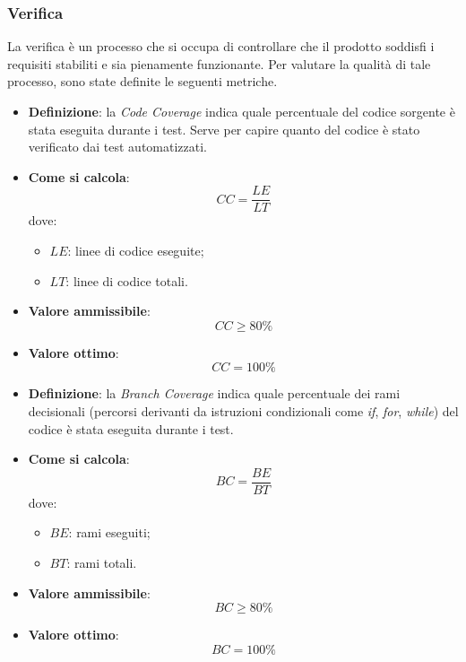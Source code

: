 \subsubsection{Verifica}
La verifica è un processo che si occupa di controllare che il prodotto soddisfi i requisiti stabiliti
e sia pienamente funzionante. Per valutare la qualità di tale processo, sono state definite le seguenti metriche.

\begin{itemize}
	\item \textbf{Definizione}: la \textit{Code Coverage} indica quale percentuale del codice sorgente è stata eseguita durante i test. Serve per capire quanto del codice è stato verificato dai test automatizzati.
	\item \textbf{Come si calcola}: \begin{equation*}CC = \frac{LE}{LT}\end{equation*} dove:
		\begin{itemize}
			\item $LE$: linee di codice eseguite;
			\item $LT$: linee di codice totali.
		\end{itemize}
	\item \textbf{Valore ammissibile}: \begin{equation*}CC \geq 80\%\end{equation*}
	\item \textbf{Valore ottimo}: \begin{equation*}CC = 100\%\end{equation*}
\end{itemize}

\begin{itemize}
	\item \textbf{Definizione}: la \textit{Branch Coverage} indica quale percentuale dei rami decisionali (percorsi derivanti da istruzioni condizionali come \textit{if}, \textit{for}, \textit{while}) del codice è stata eseguita durante i test.
	\item \textbf{Come si calcola}: \begin{equation*}BC = \frac{BE}{BT}\end{equation*} dove:
		\begin{itemize}
			\item $BE$: rami eseguiti;
			\item $BT$: rami totali.
		\end{itemize}
	\item \textbf{Valore ammissibile}: \begin{equation*}BC \geq 80\%\end{equation*}
	\item \textbf{Valore ottimo}: \begin{equation*}BC = 100\%\end{equation*}
\end{itemize}

